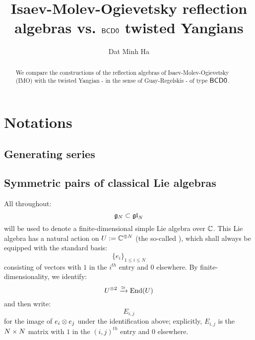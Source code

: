 

\setcounter{section}{-1}


\renewcommand{\simpleroots}{\mathbb{I}}
\newcommand{\romanzero}{\mathsf{0}}
\newcommand{\romanone}{\mathsf{I}}
\newcommand{\romantwo}{\mathsf{II}}
\newcommand{\romanthree}{\mathsf{III}}
\newcommand{\BCDzero}{\sfB\sfC\sfD\romanzero}
\newcommand{\UB}{\mathcal{UB}}
\newcommand{\XB}{\mathcal{XB}}
\newcommand{\ZB}{\mathcal{ZB}}



    \title{Isaev-Molev-Ogievetsky reflection algebras vs. $\BCDzero$ twisted Yangians}
    
    \author{Dat Minh Ha}
    \maketitle
    
    \begin{abstract}
        We compare the constructions of the reflection algebras of Isaev-Molev-Ogievetsky (IMO) with the twisted Yangian - in the sense of Guay-Regelskis - of type $\BCDzero$.
    \end{abstract}
    
    {
    \hypersetup{} 
    \tableofcontents %
    }

    \section{Notations}
        \subsection{Generating series}

        \subsection{Symmetric pairs of classical Lie algebras}
            All throughout:
                $$\mathfrak{g}_N \subset \mathfrak{gl}_N$$
            will be used to denote a finite-dimensional simple Lie algebra over $\mathbb{C}$. This Lie algebra has a natural action on $U := \mathbb{C}^{\oplus N}$ (the so-called ), which shall always be equipped with the standard basis:
                $$\{e_i\}_{1 \leq i \leq N}$$
            consisting of vectors with $1$ in the $i^{th}$ entry and $0$ elsewhere. By finite-dimensionality, we identify:
                $$U^{\tensor 2} \xrightarrow[]{\cong} \End(U)$$
            and then write:
                $$E_{i, j}$$
            for the image of $e_i \tensor e_j$ under the identification above; explicitly, $E_{i, j}$ is the $N \x N$ matrix with $1$ in the $(i, j)^{th}$ entry and $0$ elsewhere.

